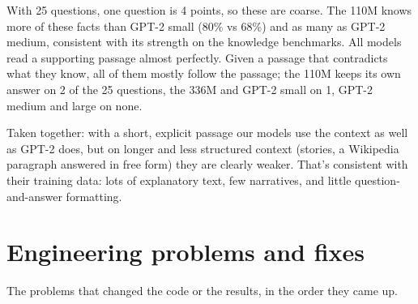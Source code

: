\documentclass[11pt]{article}
\begin{document}
With 25 questions, one question is 4 points, so these are coarse. The 110M knows more of these facts than GPT-2 small (80\% vs 68\%) and as many as GPT-2 medium, consistent with its strength on the knowledge benchmarks. All models read a supporting passage almost perfectly. Given a passage that contradicts what they know, all of them mostly follow the passage; the 110M keeps its own answer on 2 of the 25 questions, the 336M and GPT-2 small on 1, GPT-2 medium and large on none.

Taken together: with a short, explicit passage our models use the context as well as GPT-2 does, but on longer and less structured context (stories, a Wikipedia paragraph answered in free form) they are clearly weaker. That's consistent with their training data: lots of explanatory text, few narratives, and little question-and-answer formatting.

\section{Engineering problems and fixes}

The problems that changed the code or the results, in the order they came up.
\end{document}
